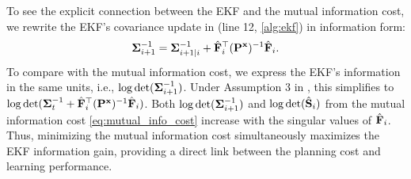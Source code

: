 To see the explicit connection between the EKF and the mutual information cost, we rewrite the EKF's covariance update in (line 12, \cref{alg:ekf}) in information form:
\begin{equation}
    \boldsymbol{\boldsymbol{\Sigma}}_{i+1}^{-1} = \boldsymbol{\boldsymbol{\Sigma}}_{i+1|i}^{-1} + \hat{\mathbf{F}}_i^\top (\mathbf{P}^{\mathbf{x}})^{-1} \hat{\mathbf{F}}_i. 
    \label{eq:}
\end{equation}
To compare with the mutual information cost, we express the EKF's information in the same units, i.e., $\log \det(\boldsymbol{\boldsymbol{\Sigma}}_{i+1}^{-1})$.
Under Assumption 3 in , this simplifies to $\log \det(\boldsymbol{\boldsymbol{\Sigma}}_t^{-1} + \hat{\mathbf{F}}_i^\top (\mathbf{P}^{\mathbf{x}})^{-1} \hat{\mathbf{F}}_i)$. 
Both $\log \det(\boldsymbol{\boldsymbol{\Sigma}}_{i+1}^{-1})$ and $\log \det(\hat{\mathbf{S}}_i)$ from the mutual information cost \eqref{eq:mutual_info_cost} increase with the singular values of $\hat{\mathbf{F}}_i$.
Thus, minimizing the mutual information cost simultaneously maximizes the EKF information gain, providing a direct link between the planning cost and learning performance.

